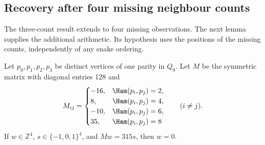 \subsection{Recovery after four missing neighbour counts}
\label{sec:four-erasure239}
The three-count result extends to four missing observations. The next
lemma supplies the additional arithmetic. Its hypothesis uses the
positions of the missing counts, independently of any snake ordering.

\begin{lemma}\label{lem:four-matrix239}
Let $p_0,p_1,p_2,p_3$ be distinct vertices of one parity in $Q_9$.
Let $M$ be the symmetric matrix with diagonal entries 128 and
\[
M_{ij}=\begin{cases}
-16,&\Ham(p_i,p_j)=2,\\
8,&\Ham(p_i,p_j)=4,\\
-10,&\Ham(p_i,p_j)=6,\\
35,&\Ham(p_i,p_j)=8
\end{cases}\qquad(i\ne j).
\]
If $w\in\mathbb Z^4$, $s\in\{-1,0,1\}^4$, and $Mw=315s$, then $w=0$.
\end{lemma}
